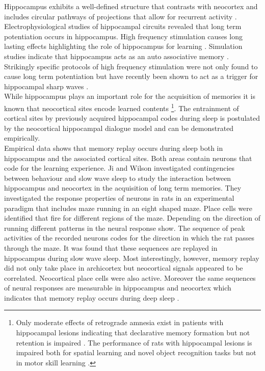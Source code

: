Hippocampus exhibits a well-defined structure that contrasts with neocortex and includes circular pathways of projections that allow for recurrent activity \parencite{graham2010associative}. Electrophysiological studies of hippocampal circuits revealed that long term potentiation occurs in hippocampus. High frequency stimulation causes long lasting effects highlighting the role of hippocampus for learning \parencite{behrens2005induction}. Simulation studies indicate that hippocampus acts as an auto associative memory \parencite{graham2010associative}. Strikingly specific protocols of high frequency stimulation were not only found to cause long term potentiation but have recently been shown to act as a trigger for hippocampal sharp waves \parencite{behrens2005induction}.\\
 While hippocampus plays an important role for the acquisition of memories it is known that neocortical sites encode learned contents \footnote{Only moderate effects of retrograde amnesia exist in patients with hippocampal lesions indicating that declarative memory formation but not retention is impaired \parencite{spiers2001hippocampal}. The performance of rats with hippocampal lesions is impaired both for spatial learning and novel object recognition tasks but not in motor skill learning \parencite{gould2002effects}.}. The entrainment of cortical sites by previously acquired hippocampal codes during sleep is postulated by the neocortical hippocampal dialogue model and can be demonstrated empirically.\\
Empirical data shows that memory replay occurs during sleep both in hippocampus and the associated cortical sites. Both areas contain neurons that code for the learning experience. Ji and Wilson \parencite*{ji2007coordinated} investigated contingencies between behaviour and slow wave sleep to study the interaction between hippocampus and neocortex in the acquisition of long term memories. They investigated the response properties of neurons in rats in an experimental paradigm that includes maze running in an eight shaped maze. Place cells were identified that fire for different regions of the maze. Depending on the direction of running different patterns in the neural response show. The sequence of peak activities of the recorded neurons codes for the direction in which the rat passes through the maze. It was found that these sequences are replayed in hippocampus during slow wave sleep. Most interestingly, however, memory replay did not only take place in archicortex but neocortical signals appeared to be correlated. Neocortical place cells were also active. Moreover the same sequences of neural responses are measurable in hippocampus and neocortex which indicates that memory replay occurs during deep sleep \parencite{ji2007coordinated}.\\
